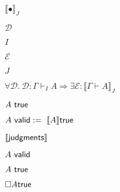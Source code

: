 \documentclass[10pt]{book}
\begin{document}
\begin{mdSnippets}
\begin{mdInlineSnippet}
$\llbracket\bullet \rrbracket_J$\end{mdInlineSnippet}%
\begin{mdInlineSnippet}%
$\mathcal{D}$\end{mdInlineSnippet}%
\begin{mdInlineSnippet}[dd7536794b63bf90eccfd37f9b147d7f]%
$I$\end{mdInlineSnippet}%
\begin{mdInlineSnippet}%
$\mathcal{E}$\end{mdInlineSnippet}%
\begin{mdInlineSnippet}%
$J$\end{mdInlineSnippet}%
\begin{mdInlineSnippet}[8ee221b554f334322dd70423103cfd8b]%
$\forall \mathcal{D}. \ \mathcal{D}:\Gamma\vdash_I A \Longrightarrow \exists\mathcal{E}: \llbracket \Gamma\vdash A\rrbracket_J$\end{mdInlineSnippet}%
\begin{mdInlineSnippet}%
$A \ {\sf true}$\end{mdInlineSnippet}%
\begin{mdInlineSnippet}[9f791c2d98cbbb2d22338197dd5d3ca4]%
$A\  {\sf valid}:=\  \llbracket A \rrbracket {\sf true}$\end{mdInlineSnippet}%
\begin{mdInlineSnippet}%
$\llbracket \sf {judgments}\rrbracket$\end{mdInlineSnippet}%
\begin{mdInlineSnippet}%
$A\  {\sf valid}$\end{mdInlineSnippet}%
\begin{mdInlineSnippet}[74410d2102c7e4d1addb996fb9281284]%
$ A\ {\sf true}$\end{mdInlineSnippet}%
\begin{mdInlineSnippet}[2c8cf22ebf917cd1033d6c2a4e929d76]%
$ \Box A {\sf true}$\end{mdInlineSnippet}%
\begin{mdDisplaySnippet}%

\end{mdDisplaySnippet}
\end{mdSnippets}
\end{document}
